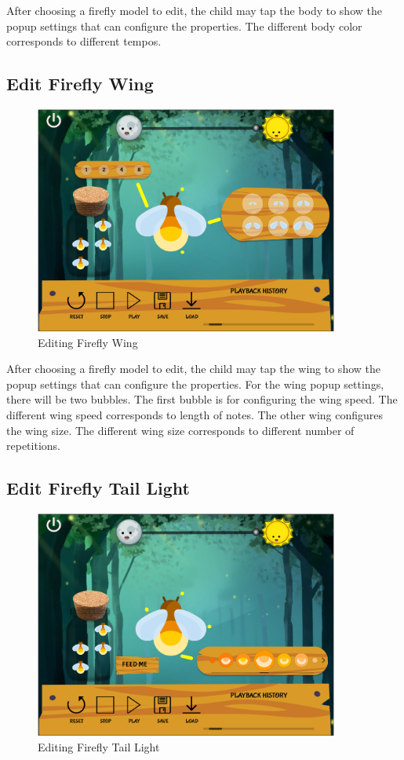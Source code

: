 After choosing a firefly model to edit, the child may tap the body to show the popup settings that can configure the properties. The different body color corresponds to different tempos.

\subsection{Edit Firefly Wing}

\begin{figure}[H]
    \centering
    \includegraphics[width=10cm]{figures/Wing.png}
    \caption{Editing Firefly Wing}
    \label{fig:tweakWing}
\end{figure}

After choosing a firefly model to edit, the child may tap the wing to show the popup settings that can configure the properties. For the wing popup settings, there will be two bubbles. The first bubble is for configuring the wing speed. The different wing speed corresponds to length of notes. The other wing configures the wing size. The different wing size corresponds to different number of repetitions. 

\subsection{Edit Firefly Tail Light}

\begin{figure}[H]
    \centering
    \includegraphics[width=10cm]{figures/Tail.png}
    \caption{Editing Firefly Tail Light}
    \label{fig:tweakTail}
\end{figure}

